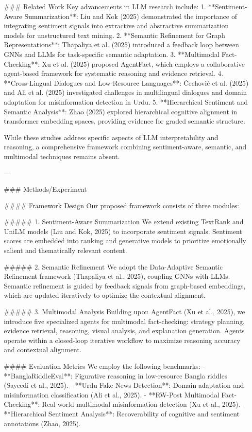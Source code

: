 ### Related Work
Key advancements in LLM research include:
1. **Sentiment-Aware Summarization**: Liu and Kok (2025) demonstrated the importance of integrating sentiment signals into extractive and abstractive summarization models for unstructured text mining.
2. **Semantic Refinement for Graph Representations**: Thapaliya et al. (2025) introduced a feedback loop between GNNs and LLMs for task-specific semantic adaptation.
3. **Multimodal Fact-Checking**: Xu et al. (2025) proposed AgentFact, which employs a collaborative agent-based framework for systematic reasoning and evidence retrieval.
4. **Cross-Lingual Dialogues and Low-Resource Languages**: Čechovič et al. (2025) and Ali et al. (2025) investigated challenges in multilingual dialogues and domain adaptation for misinformation detection in Urdu.
5. **Hierarchical Sentiment and Semantic Analysis**: Zhao (2025) explored hierarchical cognitive alignment in transformer embedding spaces, providing evidence for graded semantic structure.

While these studies address specific aspects of LLM interpretability and reasoning, a comprehensive framework combining sentiment-aware, semantic, and multimodal techniques remains absent.

---

### Methods/Experiment

#### Framework Design
Our proposed framework consists of three modules:

##### 1. Sentiment-Aware Summarization
We extend existing TextRank and UniLM models (Liu and Kok, 2025) to incorporate sentiment signals. Sentiment scores are embedded into ranking and generative models to prioritize emotionally salient and thematically relevant content.

##### 2. Semantic Refinement
We adopt the Data-Adaptive Semantic Refinement framework (Thapaliya et al., 2025), coupling GNNs with LLMs. Semantic refinement is guided by feedback signals from graph-based embeddings, which are updated iteratively to optimize the contextual alignment.

##### 3. Multimodal Analysis
Building upon AgentFact (Xu et al., 2025), we introduce five specialized agents for multimodal fact-checking: strategy planning, evidence retrieval, reasoning, visual analysis, and explanation generation. Agents operate within a closed-loop iterative workflow to maximize reasoning accuracy and contextual alignment.

#### Evaluation Metrics
We employ the following benchmarks:
- **BanglaRiddleEval**: Figurative reasoning in low-resource Bangla riddles (Sayeedi et al., 2025).
- **Urdu Fake News Detection**: Domain adaptation and misinformation classification (Ali et al., 2025).
- **RW-Post Multimodal Fact-Checking**: Real-world multimodal misinformation detection (Xu et al., 2025).
- **Hierarchical Sentiment Analysis**: Recoverability of cognitive and sentiment annotations (Zhao, 2025).

